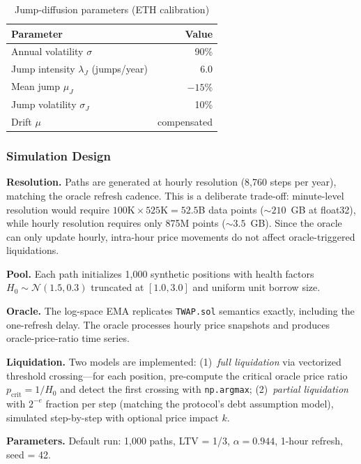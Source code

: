 \documentclass[10pt,a4paper,twocolumn]{article}
\theoremstyle{definition}
\theoremstyle{plain}
\theoremstyle{remark}
\begin{document}
\begin{table}[htbp]
\centering
\caption{Jump-diffusion parameters (ETH calibration)}
\label{tab:jd-params}
\small
\begin{tabularx}{0.85\columnwidth}{@{}>{\raggedright\arraybackslash}X r@{}}
\toprule
Parameter & Value \\
\midrule
Annual volatility $\sigma$ & 90\% \\
Jump intensity $\lambda_J$ (jumps/year) & 6.0 \\
Mean jump $\mu_J$ & $-15\%$ \\
Jump volatility $\sigma_J$ & 10\% \\
Drift $\mu$ & compensated \\
\bottomrule
\end{tabularx}
\end{table}

\subsubsection{Simulation Design}
\label{subsec:bd-sim_design}

\textbf{Resolution.} Paths are generated at hourly resolution (8{,}760 steps per year), matching the oracle refresh cadence. This is a deliberate trade-off: minute-level resolution would require $100\text{K} \times 525\text{K} = 52.5$B data points (${\sim}210$~GB at float32), while hourly resolution requires only 875M points (${\sim}3.5$~GB). Since the oracle can only update hourly, intra-hour price movements do not affect oracle-triggered liquidations.

\textbf{Pool.} Each path initializes 1{,}000 synthetic positions with health factors $H_0 \sim \mathcal{N}(1.5, 0.3)$ truncated at $[1.0, 3.0]$ and uniform unit borrow size.

\textbf{Oracle.} The log-space EMA replicates \texttt{TWAP.sol} semantics exactly, including the one-refresh delay. The oracle processes hourly price snapshots and produces oracle-price-ratio time series.

\textbf{Liquidation.} Two models are implemented: (1)~\emph{full liquidation} via vectorized threshold crossing---for each position, pre-compute the critical oracle price ratio $p_{\text{crit}} = 1/H_0$ and detect the first crossing with \texttt{np.argmax}; (2)~\emph{partial liquidation} with $2^{-e}$ fraction per step (matching the protocol's debt assumption model), simulated step-by-step with optional price impact $k$.

\textbf{Parameters.} Default run: 1{,}000 paths, LTV = 1/3, $\alpha = 0.944$, 1-hour refresh, seed = 42.
\end{document}
